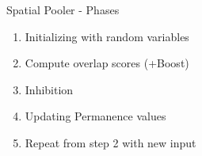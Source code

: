 \begin{frame}[c]{Spatial Pooler - Phases}
    \Large
    \begin{enumerate}[<+(1)->]
        \item Initializing with random variables
        \item Compute overlap scores (+Boost)
        \item Inhibition
        \item Updating Permanence values
        \item Repeat from step 2 with new input
    \end{enumerate}
\end{frame}



% 
% 
% 
% 
% 
% 
% 





